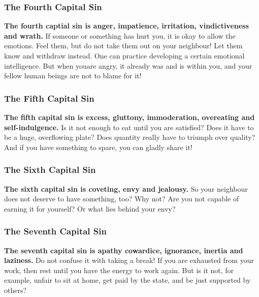 \documentclass[12pt,a5paper]{article}
\begin{document}
	\subsubsection{The Fourth Capital Sin}
		\textbf{The fourth captial sin is anger,
		impatience,
		irritation,
		vindictiveness and wrath.}
		If someone or something has hurt you,
		it is okay to allow the emotions.
		Feel them,
		but do not take them out on your neighbour!
		Let them know and withdraw instead.
		One can practice developing a certain emotional intelligence.
		But when youare angry,
		it already was and is within you,
		and your fellow human beings are not to blame for it!

	\subsubsection{The Fifth Capital Sin}
		\textbf{The fifth capital sin is excess,
		gluttony,
		immoderation,
		overeating and self-indulgence.}
		Is it not enough to eat until you are satisfied?
		Does it have to be a huge,
		overflowing plate?
		Does quantity really have to triumph over quality?
		And if you have something to spare,
		you can gladly share it!
	
	\subsubsection{The Sixth Capital Sin}
		\textbf{The sixth capital sin is coveting,
		envy and jealousy.}
		So your neighbour does not deserve to have something, too?
		Why not?
		Are you not capable of earning it for yourself?
		Or what lies behind your envy?

	\subsubsection{The Seventh Capital Sin}
		\textbf{The seventh capital sin is apathy
		cowardice,
		ignorance,
		inertia and laziness.}
		Do not confuse it with taking a break!
		If you are exhausted from your work,
		then rest until you have the energy to work again.
		But is it not,
		for example,
		unfair to sit at home,
		get paid by the state,
		and be just supported by others?
	
	\newpage
\end{document}

